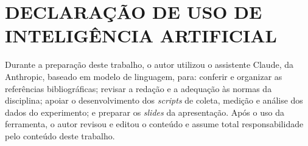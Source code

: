 \section*{DECLARAÇÃO DE USO DE INTELIGÊNCIA ARTIFICIAL}

Durante a preparação deste trabalho, o autor utilizou o assistente Claude, da Anthropic, baseado em modelo de linguagem, para: conferir e organizar as referências bibliográficas; revisar a redação e a adequação às normas da disciplina; apoiar o desenvolvimento dos \textit{scripts} de coleta, medição e análise dos dados do experimento; e preparar os \textit{slides} da apresentação. Após o uso da ferramenta, o autor revisou e editou o conteúdo e assume total responsabilidade pelo conteúdo deste trabalho.
